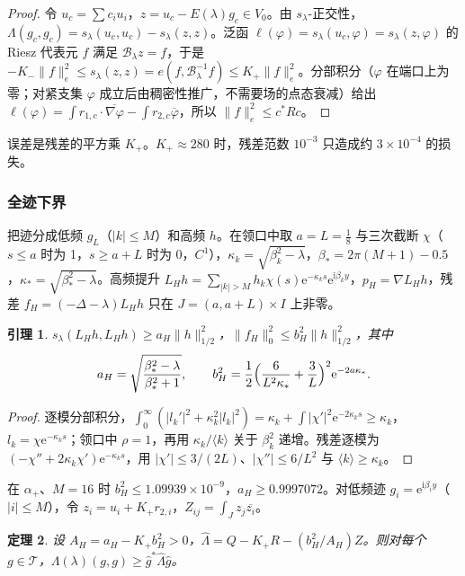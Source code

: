 \documentclass[11pt,a4paper,fontset=fandol]{ctexart}
\newcommand{\ii}{\mathrm{i}}
\newcommand{\ee}{\mathrm{e}}
\newcommand{\Tr}{\mathcal T}
\theoremstyle{plain}
\newtheorem{theorem}{定理}[section]
\newtheorem{lemma}[theorem]{引理}
\theoremstyle{definition}
\theoremstyle{remark}
\begin{document}
\begin{proof}
令 $u_c=\sum c_iu_i$，$z=u_c-E(\lambda)g_c\in V_0$。由 $s_\lambda$-正交性，$\Lambda(g_c,g_c)=s_\lambda(u_c,u_c)-s_\lambda(z,z)$。泛函 $\ell(\varphi)=s_\lambda(u_c,\varphi)=s_\lambda(z,\varphi)$ 的 Riesz 代表元 $f$ 满足 $\mathcal B_\lambda z=f$，于是 $-K_-\|f\|_e^2\le s_\lambda(z,z)=e(f,\mathcal B_\lambda^{-1}f)\le K_+\|f\|_e^2$。分部积分（$\varphi$ 在端口上为零；对紧支集 $\varphi$ 成立后由稠密性推广，不需要场的点态衰减）给出 $\ell(\varphi)=\int r_{1,c}\cdot\overline{\nabla\varphi}-\int r_{2,c}\overline\varphi$，所以 $\|f\|_e^2\le c^*Rc$。
\end{proof}

误差是残差的平方乘 $K_+$。$K_+\approx280$ 时，残差范数 $10^{-3}$ 只造成约 $3\times10^{-4}$ 的损失。

\subsubsection{全迹下界}

把迹分成低频 $g_L$（$|k|\le M$）和高频 $h$。在领口中取 $a=L=\frac18$ 与三次截断 $\chi$（$s\le a$ 时为 1，$s\ge a+L$ 时为 0，$C^1$），$\kappa_k=\sqrt{\beta_k^2-\lambda}$，$\beta_*=2\pi(M+1)-0.5$，$\kappa_*=\sqrt{\beta_*^2-\lambda}$。高频提升 $L_Hh=\sum_{|k|>M}h_k\chi(s)\ee^{-\kappa_ks}\ee^{\ii\beta_ky}$，$p_H=\nabla L_Hh$，残差 $f_H=(-\Delta-\lambda)L_Hh$ 只在 $J=(a,a+L)\times I$ 上非零。

\begin{lemma}
\label{lem:high-lift}
$s_\lambda(L_Hh,L_Hh)\ge a_H\|h\|_{1/2}^2$，$\|f_H\|_0^2\le b_H^2\|h\|_{1/2}^2$，其中
\[
a_H=\sqrt{\frac{\beta_*^2-\lambda}{\beta_*^2+1}},\qquad b_H^2=\frac12\Bigl(\frac6{L^2\kappa_*}+\frac3L\Bigr)^2\ee^{-2a\kappa_*}.
\]
\end{lemma}

\begin{proof}
逐模分部积分，$\int_0^\infty(|l_k'|^2+\kappa_k^2|l_k|^2)=\kappa_k+\int|\chi'|^2\ee^{-2\kappa_ks}\ge\kappa_k$，$l_k=\chi\ee^{-\kappa_ks}$；领口中 $\rho=1$，再用 $\kappa_k/\langle k\rangle$ 关于 $\beta_k^2$ 递增。残差逐模为 $(-\chi''+2\kappa_k\chi')\ee^{-\kappa_ks}$，用 $|\chi'|\le3/(2L)$、$|\chi''|\le6/L^2$ 与 $\langle k\rangle\ge\kappa_k$。
\end{proof}

在 $\alpha_+$、$M=16$ 时 $b_H^2\le1.09939\times10^{-9}$，$a_H\ge0.9997072$。对低频迹 $g_i=\ee^{\ii\beta_iy}$（$|i|\le M$），令 $z_i=u_i+K_+r_{2,i}$，$Z_{ij}=\int_Jz_j\overline{z_i}$。

\begin{theorem}
\label{thm:dtn-lower}
设 $A_H=a_H-K_+b_H^2>0$，$\hat\Lambda=Q-K_+R-(b_H^2/A_H)Z$。则对每个 $g\in\Tr$，$\Lambda(\lambda)(g,g)\ge\hat g^*\hat\Lambda\hat g$。
\end{theorem}
\end{document}
